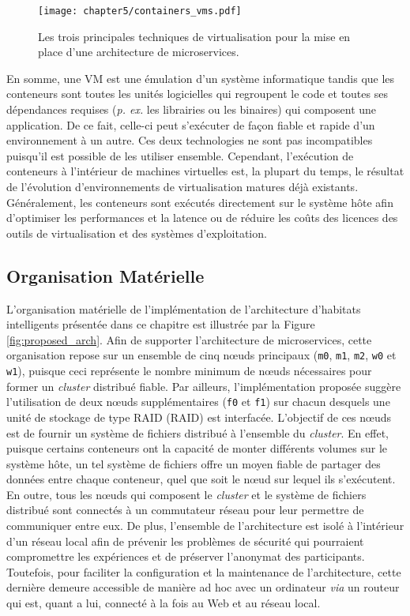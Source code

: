 \begin{figure}[H]
	\centering
	\texttt{[image: chapter5/containers\_vms.pdf]}
		\caption{Les trois principales techniques de virtualisation pour la mise en place d'une architecture de microservices.}
	\label{fig:containers_vms}
\end{figure}

En somme, une \acs{VM} est une émulation d'un système informatique tandis que les conteneurs sont toutes les unités logicielles qui regroupent le code et toutes ses dépendances requises (\textit{p. ex.} les librairies ou les binaires) qui composent une application. De ce fait, celle-ci peut s'exécuter de façon fiable et rapide d'un environnement à un autre. Ces deux technologies ne sont pas incompatibles puisqu'il est possible de les utiliser ensemble. Cependant, l'exécution de conteneurs à l'intérieur de machines virtuelles est, la plupart du temps, le résultat de l'évolution d'environnements de virtualisation matures déjà existants. Généralement, les conteneurs sont exécutés directement sur le système hôte afin d'optimiser les performances et la latence ou de réduire les coûts des licences des outils de virtualisation et des systèmes d'exploitation.

\subsection{Organisation Matérielle}

L'organisation matérielle de l'implémentation de l'architecture d'habitats intelligents présentée dans ce chapitre est illustrée par la Figure \ref{fig:proposed_arch}. Afin de supporter l'architecture de microservices, cette organisation repose sur un ensemble de cinq n\oe{}uds principaux (\texttt{m0}, \texttt{m1}, \texttt{m2}, \texttt{w0} et \texttt{w1}), puisque ceci représente le nombre minimum de n\oe{}uds nécessaires pour former un \textit{cluster} distribué fiable. Par ailleurs, l'implémentation proposée suggère l'utilisation de deux  n\oe{}uds supplémentaires (\texttt{f0} et \texttt{f1}) sur chacun desquels une unité de stockage de type \acs{RAID} (\acl{RAID}) est interfacée. L'objectif de ces n\oe{}uds est de fournir un système de fichiers distribué à l'ensemble du \textit{cluster}. En effet, puisque certains conteneurs ont la capacité de monter différents volumes sur le système hôte, un tel système de fichiers offre un moyen fiable de partager des données entre chaque conteneur, quel que soit le n\oe{}ud sur lequel ils s'exécutent. En outre, tous les n\oe{}uds qui composent le \textit{cluster} et le système de fichiers distribué sont connectés à un commutateur réseau pour leur permettre de communiquer entre eux. De plus, l'ensemble de l'architecture est isolé à l'intérieur d'un réseau local afin de prévenir les problèmes de sécurité qui pourraient compromettre les expériences et de préserver l'anonymat des participants. Toutefois, pour faciliter la configuration et la maintenance de l'architecture, cette dernière demeure accessible de manière ad hoc avec un ordinateur \textit{via} un routeur qui est, quant a lui, connecté à la fois au Web et au réseau local.


